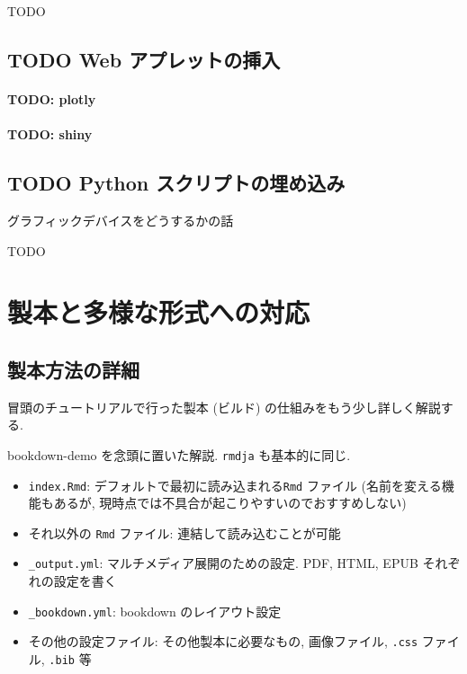 \documentclass[
  nomag]{bxjsbook}
\providecommand{\tightlist}{%
  \setlength{\itemsep}{0pt}\setlength{\parskip}{0pt}}
\theoremstyle{definition}
\theoremstyle{definition}
\theoremstyle{definition}
\theoremstyle{remark}
\begin{document}
TODO

\hypertarget{webapp}{%
\chapter{TODO Web アプレットの挿入}\label{webapp}}

\hypertarget{todo-plotly}{%
\subsection{TODO: plotly}\label{todo-plotly}}

\hypertarget{todo-shiny}{%
\subsection{TODO: shiny}\label{todo-shiny}}

\hypertarget{python}{%
\chapter{TODO Python スクリプトの埋め込み}\label{python}}

グラフィックデバイスをどうするかの話

TODO

\hypertarget{part-ux88fdux672cux3068ux591aux69d8ux306aux5f62ux5f0fux3078ux306eux5bfeux5fdc}{%
\part{
製本と多様な形式への対応}\label{part-ux88fdux672cux3068ux591aux69d8ux306aux5f62ux5f0fux3078ux306eux5bfeux5fdc}}

\hypertarget{ux88fdux672cux65b9ux6cd5ux306eux8a73ux7d30}{%
\chapter{製本方法の詳細}\label{ux88fdux672cux65b9ux6cd5ux306eux8a73ux7d30}}

冒頭のチュートリアルで行った製本 (ビルド)
の仕組みをもう少し詳しく解説する.

bookdown-demo を念頭に置いた解説. \texttt{rmdja} も基本的に同じ.

\begin{itemize}
\tightlist
\item
  \texttt{index.Rmd}: デフォルトで最初に読み込まれる\texttt{Rmd}
  ファイル (名前を変える機能もあるが,
  現時点では不具合が起こりやすいのでおすすめしない)
\item
  それ以外の \texttt{Rmd} ファイル: 連結して読み込むことが可能
\item
  \texttt{\_output.yml}: マルチメディア展開のための設定. PDF, HTML, EPUB
  それぞれの設定を書く
\item
  \texttt{\_bookdown.yml}: bookdown のレイアウト設定
\item
  その他の設定ファイル: その他製本に必要なもの, 画像ファイル,
  \texttt{.css} ファイル, \texttt{.bib} 等
\end{itemize}
\end{document}
